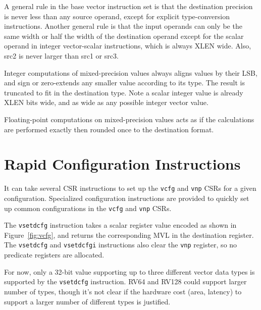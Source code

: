 A general rule in the base vector instruction set is that the
destination precision is never less than any source operand, except
for explicit type-conversion instructions.  Another general rule is
that the input operands can only be the same width or half the width
of the destination operand except for the scalar operand in integer
vector-scalar instructions, which is always XLEN wide.  Also, src2 is
never larger than src1 or src3.

Integer computations of mixed-precision values always aligns values by
their LSB, and sign or zero-extends any smaller value according to its
type.  The result is truncated to fit in the destination type.  Note a
scalar integer value is already XLEN bits wide, and as wide as any
possible integer vector value.

Floating-point computations on mixed-precision values acts as if the
calculations are performed exactly then rounded once to the
destination format.

\section{Rapid Configuration Instructions}

It can take several CSR instructions to set up the {\tt vcfg} and
{\tt vnp} CSRs for a given configuration.  Specialized configuration
instructions are provided to quickly set up common configurations in
the {\tt vcfg} and {\tt vnp} CSRs.

The {\tt vsetdcfg} instruction takes a scalar register value encoded as
shown in Figure~\ref{fig:vcfg}, and returns the corresponding MVL in
the destination register.  The {\tt vsetdcfg} and {\tt vsetdcfgi}
instructions also clear the {\tt vnp} register, so no predicate
registers are allocated.

\begin{discussion}
  For now, only a 32-bit value supporting up to three different vector
  data types is supported by the {\tt vsetdcfg} instruction.  RV64 and
  RV128 could support larger number of types, though it's not clear if
  the hardware cost (area, latency) to support a larger number of
  different types is justified.
\end{discussion}

